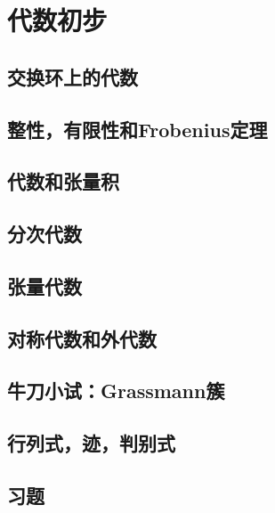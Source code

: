 \chapter{代数初步}

\section{交换环上的代数}
\section{整性，有限性和Frobenius定理}
\section{代数和张量积}
\section{分次代数}
\section{张量代数}
\section{对称代数和外代数}
\section{牛刀小试：Grassmann簇}
\section{行列式，迹，判别式}
\section{习题}